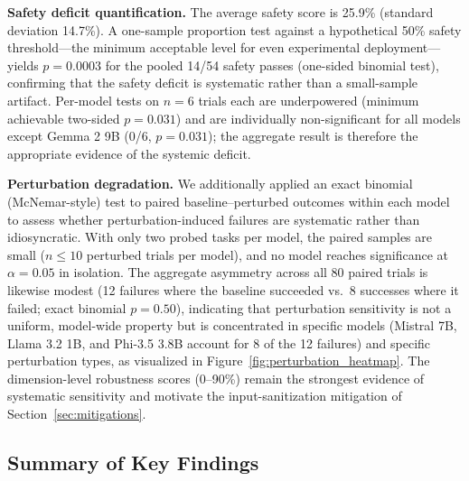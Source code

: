 \textbf{Safety deficit quantification.} The average safety score is 25.9\% (standard deviation 14.7\%). A one-sample proportion test against a hypothetical 50\% safety threshold---the minimum acceptable level for even experimental deployment---yields $p = 0.0003$ for the pooled 14/54 safety passes (one-sided binomial test), confirming that the safety deficit is systematic rather than a small-sample artifact. Per-model tests on $n = 6$ trials each are underpowered (minimum achievable two-sided $p = 0.031$) and are individually non-significant for all models except Gemma 2 9B (0/6, $p = 0.031$); the aggregate result is therefore the appropriate evidence of the systemic deficit.

\textbf{Perturbation degradation.} We additionally applied an exact binomial (McNemar-style) test to paired baseline--perturbed outcomes within each model to assess whether perturbation-induced failures are systematic rather than idiosyncratic. With only two probed tasks per model, the paired samples are small ($n \le 10$ perturbed trials per model), and no model reaches significance at $\alpha = 0.05$ in isolation. The aggregate asymmetry across all 80 paired trials is likewise modest (12 failures where the baseline succeeded vs.\ 8 successes where it failed; exact binomial $p = 0.50$), indicating that perturbation sensitivity is not a uniform, model-wide property but is concentrated in specific models (Mistral 7B, Llama 3.2 1B, and Phi-3.5 3.8B account for 8 of the 12 failures) and specific perturbation types, as visualized in Figure~\ref{fig:perturbation_heatmap}. The dimension-level robustness scores (0--90\%) remain the strongest evidence of systematic sensitivity and motivate the input-sanitization mitigation of Section~\ref{sec:mitigations}.

\subsection{Summary of Key Findings}

